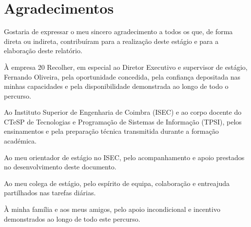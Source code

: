 

\section*{Agradecimentos}

Gostaria de expressar o meu sincero agradecimento a todos os que, de forma direta ou indireta, contribuíram para a realização deste estágio e para a elaboração deste relatório.

À empresa 20 Recolher, em especial ao Diretor Executivo e supervisor de estágio, Fernando Oliveira, pela oportunidade concedida, pela confiança depositada nas minhas capacidades e pela disponibilidade demonstrada ao longo de todo o percurso.

Ao Instituto Superior de Engenharia de Coimbra (ISEC) e ao corpo docente do CTeSP de Tecnologias e Programação de Sistemas de Informação (TPSI), pelos ensinamentos e pela preparação técnica transmitida durante a formação académica.

Ao meu orientador de estágio no ISEC, pelo acompanhamento e apoio prestados no desenvolvimento deste documento.

Ao meu colega de estágio, pelo espírito de equipa, colaboração e entreajuda partilhados nas tarefas diárias.

À minha família e aos meus amigos, pelo apoio incondicional e incentivo demonstrados ao longo de todo este percurso.



